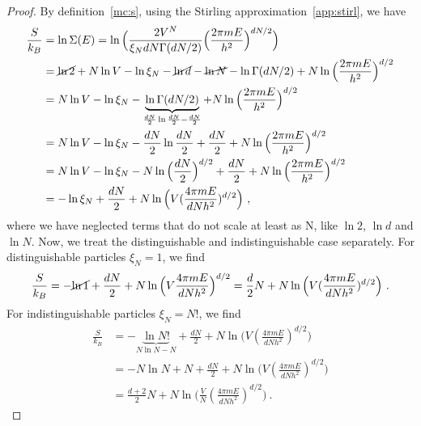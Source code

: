     \begin{proof}
        By definition~\eqref{mc:s}, using the Stirling approximation~\eqref{app:stirl}, we have
        \begin{equation*}
        \begin{aligned}
            \frac{S}{k_B} & = \ln \Sigma (E) = \ln \Big ( \frac{2V^{N}}{\xi_N d N \Gamma(dN/2)} \Big ( \frac{2 \pi m E}{h^2}\Big)^{dN/2} \Big ) \\ & = \cancel{\ln 2} + N \ln V - \ln \xi_N - \cancel{\ln d} - \cancel{\ln N} - \ln \Gamma (dN/2) + N \ln \Big (\frac{2 \pi m E}{h^2} \Big )^{d/2} \\ & =  N \ln V - \ln \xi_N - \underbrace{\ln \Gamma (dN/2)}_{\frac{dN}{2} \ln \frac{dN}{2} - \frac{dN}{2}} + N \ln \Big (\frac{2 \pi m E}{h^2} \Big )^{d/2} \\ & = N \ln V - \ln \xi_N - \frac{dN}{2} \ln \frac{dN}{2} + \frac{dN}{2} + N \ln \Big (\frac{2 \pi m E}{h^2} \Big )^{d/2} \\ & = N \ln V - \ln \xi_N - N \ln \Big(\frac{dN}{2} \Big)^{d/2} + \frac{dN}{2} + N \ln \Big (\frac{2 \pi m E}{h^2} \Big )^{d/2} \\ & = - \ln \xi_N + \frac{dN}{2} + N \ln \Big ( V (\frac{4 \pi m E}{d N h^2})^{d/2} \Big) ~,
        \end{aligned}
        \end{equation*}
        where we have neglected terms that do not scale at least as N, like $\ln 2$, $\ln d$ and $\ln N$. Now, we treat the distinguishable and indistinguishable case separately. For distinguishable particles $\xi_N = 1$, we find
        \begin{equation*}
            \frac{S}{k_B} = - \cancel{\ln 1} + \frac{dN}{2} + N \ln \Big (V \frac{4 \pi m E}{dNh^2} \Big )^{d/2} = \frac{d}{2} N + N \ln \Big ( V (\frac{4 \pi m E}{d N h^2})^{d/2} \Big) ~.
        \end{equation*}
        For indistinguishable particles $\xi_N = N!$, we find
        \begin{equation*}
        \begin{aligned}
            \frac{S}{k_B} & = - \underbrace{\ln N!}_{N \ln N - N} + \frac{dN}{2} + N \ln \Big ( V (\frac{4 \pi m E}{d N h^2})^{d/2} \Big) \\ & = - N \ln N + N + \frac{dN}{2} + N \ln \Big ( V (\frac{4 \pi m E}{d N h^2})^{d/2} \Big) \\ & = \frac{d + 2}{2} N + N \ln \Big ( \frac{V}{N} (\frac{4 \pi m E}{d N h^2})^{d/2} \Big) ~.
        \end{aligned}
        \end{equation*}
    \end{proof}

